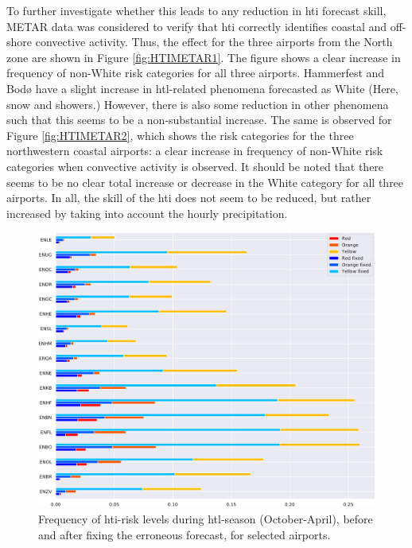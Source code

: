 To further investigate whether this leads to any reduction in \acrshort{hti} forecast skill, METAR data was considered to verify that \acrshort{hti} correctly identifies coastal and off-shore convective activity. Thus, the effect for the three airports from the North zone are shown in Figure \ref{fig:HTIMETAR1}. The figure shows a clear increase in frequency of non-White risk categories for all three airports. Hammerfest and Bodø have a slight increase in \acrshort{htl}-related phenomena forecasted as White (Here, snow and showers.) However, there is also some reduction in other phenomena such that this seems to be a non-substantial increase. The same is observed for Figure \ref{fig:HTIMETAR2}, which shows the risk categories for the three northwestern coastal airports: a clear increase in frequency of non-White risk categories when convective activity is observed. It should be noted that there seems to be no clear total increase or decrease in the White category for all three airports. In all, the skill of the \acrshort{hti} does not seem to be reduced, but rather increased by taking into account the hourly precipitation. %

\begin{figure}
    \centering
     \includegraphics[width=\textwidth]{Figures/fixeffect.pdf}
    \caption{Frequency of \acrshort{hti}-risk levels during \acrshort{htl}-season (October-April), before and after fixing the erroneous forecast, for selected airports.}
    \label{fig:fixeffect}
\end{figure}

